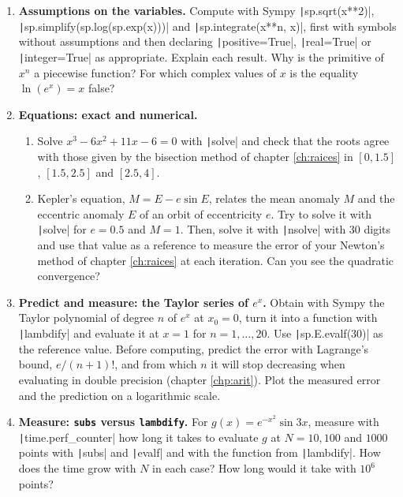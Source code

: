 \begin{enumerate}
\item \label{ej:sim_supuestos-en} \textbf{Assumptions on the variables.} Compute with Sympy \texttt|sp.sqrt(x**2)|, \texttt|sp.simplify(sp.log(sp.exp(x)))| and \texttt|sp.integrate(x**n, x)|, first with symbols without assumptions and then declaring \texttt|positive=True|, \texttt|real=True| or \texttt|integer=True| as appropriate. Explain each result. Why is the primitive of $x^n$ a piecewise function? For which complex values of $x$ is the equality $\ln(e^x)=x$ false?

\item \label{ej:sim_ecuaciones-en} \textbf{Equations: exact and numerical.}
\begin{enumerate}
\item Solve $x^3-6x^2+11x-6=0$ with \texttt|solve| and check that the roots agree with those given by the bisection method of chapter \ref{ch:raices} in $[0, 1.5]$, $[1.5, 2.5]$ and $[2.5, 4]$.
\item Kepler's equation, $M = E - e\sin E$, relates the mean anomaly $M$ and the eccentric anomaly $E$ of an orbit of eccentricity $e$. Try to solve it with \texttt|solve| for $e=0.5$ and $M=1$. Then, solve it with \texttt|nsolve| with 30 digits and use that value as a reference to measure the error of your Newton's method of chapter \ref{ch:raices} at each iteration. Can you see the quadratic convergence?
\end{enumerate}

\item \label{ej:sim_serie-en} \textbf{Predict and measure: the Taylor series of $e^x$.} Obtain with Sympy the Taylor polynomial of degree $n$ of $e^x$ at $x_0=0$, turn it into a function with \texttt|lambdify| and evaluate it at $x=1$ for $n=1,\dots,20$. Use \texttt|sp.E.evalf(30)| as the reference value. Before computing, predict the error with Lagrange's bound, $e/(n+1)!$, and from which $n$ it will stop decreasing when evaluating in double precision (chapter \ref{chp:arit}). Plot the measured error and the prediction on a logarithmic scale.

\item \label{ej:sim_lambdify-en} \textbf{Measure: \texttt{subs} versus \texttt{lambdify}.} For $g(x)=e^{-x^2}\sin 3x$, measure with \texttt|time.perf_counter| how long it takes to evaluate $g$ at $N=10, 100$ and $1000$ points with \texttt|subs| and \texttt|evalf| and with the function from \texttt|lambdify|. How does the time grow with $N$ in each case? How long would it take with $10^6$ points?


\end{enumerate}
